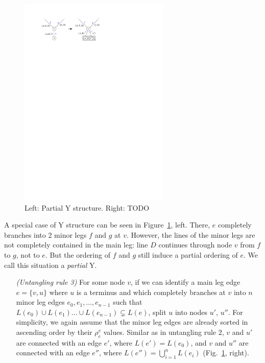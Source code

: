 \documentclass[format=acmsmall, review=false, screen=true]{acmart}
\begin{document}
\begin{figure}
  \centering
  \includegraphics[width=0.64\textwidth]{untangling/y_partial.pdf}
  \caption{Left: Partial Y structure. Right: TODO}  
  \label{FIG:untangle_y_partial}
\end{figure}

A special case of Y structure can be seen in Figure~\ref{FIG:untangle_y_partial}, left.
There, $e$ completely branches into 2 minor legs $f$ and $g$ at $v$.
However, the lines of the minor legs are not completely contained in the main leg: line $D$ continues through node $v$ from $f$ to $g$, not to $e$.
But the ordering of $f$ and $g$ still induce a partial ordering of $e$.
We call this situation a \emph{partial} Y.

\begin{enumerate}[parsep=0.5mm, wide, labelwidth=0mm, itemindent=2.3mm]
  \setlength\itemsep{1pt}
  \item[\emph{(Untangling rule 3)}] For some node $v$, if we can identify a main leg edge $e = \{v, u\}$ where $u$ is a terminus and which completely branches at $v$ into $n$ minor leg edges $e_{0}, e_{1}, ..., e_{n-1}$ such that $L(e_{0}) \cup L(e_{1}) ... \cup L(e_{n-1}) \subsetneq L(e)$, split $u$ into nodes $u'$, $u''$.
  For simplicity, we again assume that the minor leg edges are already sorted in ascending order by their $\rho^v_e$ values. 
  Similar as in untangling rule 2, $v$ and $u'$ are connected with an edge $e'$, where $L(e') = L(e_{0})$, and $v$ and $u''$ are connected with an edge $e''$, where $L(e'') = \bigcup^{n}_{i = 1} L(e_{i})$  (Fig.~\ref{FIG:untangle_y_partial}, right).
\end{enumerate}
\end{document}
